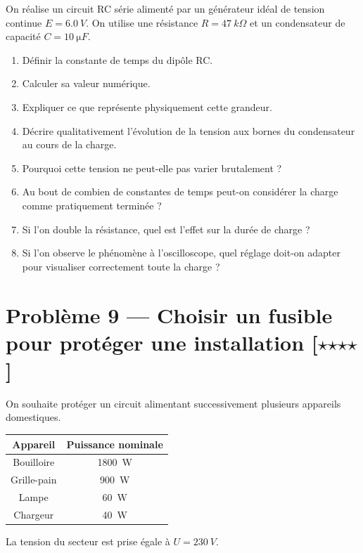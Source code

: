 \documentclass[11pt,a4paper]{article}
\newcommand{\etoile}{\ensuremath{\star}}
\begin{document}
On réalise un circuit RC série alimenté par un générateur idéal de tension continue $E=\SI{6,0}{V}$. On utilise une résistance $R=\SI{47}{k\Omega}$ et un condensateur de capacité $C=\SI{10}{\micro F}$.

\begin{enumerate}[label=\arabic*)]
    \item Définir la constante de temps du dipôle RC.
    \item Calculer sa valeur numérique.
    \item Expliquer ce que représente physiquement cette grandeur.
    \item Décrire qualitativement l'évolution de la tension aux bornes du condensateur au cours de la charge.
    \item Pourquoi cette tension ne peut-elle pas varier brutalement ?
    \item Au bout de combien de constantes de temps peut-on considérer la charge comme pratiquement terminée ?
    \item Si l'on double la résistance, quel est l'effet sur la durée de charge ?
    \item Si l'on observe le phénomène à l'oscilloscope, quel réglage doit-on adapter pour visualiser correctement toute la charge ?
\end{enumerate}

\section*{Problème 9 --- Choisir un fusible pour protéger une installation \hfill [\etoile\etoile\etoile\etoile]}

On souhaite protéger un circuit alimentant successivement plusieurs appareils domestiques.

\begin{center}
\begin{tabular}{|c|c|}
\hline
Appareil & Puissance nominale \\
\hline
Bouilloire & \SI{1800}{W} \\
Grille-pain & \SI{900}{W} \\
Lampe & \SI{60}{W} \\
Chargeur & \SI{40}{W} \\
\hline
\end{tabular}
\end{center}

La tension du secteur est prise égale à $U=\SI{230}{V}$.
\end{document}
